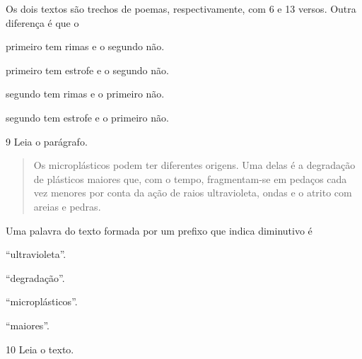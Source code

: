 Os dois textos são trechos de poemas, respectivamente, com 6 e 13
versos. Outra diferença é que o

\begin{escolha}
\item primeiro tem rimas e o segundo não.

\item primeiro tem estrofe e o segundo não.

\item segundo tem rimas e o primeiro não.

\item segundo tem estrofe e o primeiro não.
\end{escolha}


\num{9} Leia o parágrafo.

\begin{quote}
Os microplásticos podem ter diferentes origens. Uma delas é a degradação
de plásticos maiores que, com o tempo, fragmentam-se em pedaços cada vez
menores por conta da ação de raios ultravioleta, ondas e o atrito com
areias e pedras.

\end{quote}

Uma palavra do texto formada por um prefixo que indica diminutivo é

\begin{escolha}
\item ``ultravioleta''.

\item ``degradação''.

\item ``microplásticos''.

\item ``maiores''.
\end{escolha}


\num{10} Leia o texto.

